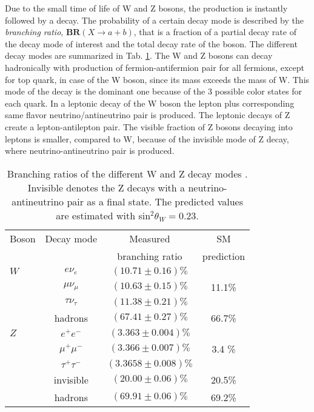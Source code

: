 Due to the small time of life of W and Z bosons, the production is instantly followed by a decay. 
The probability of a certain decay mode is described by the \textit{branching ratio}, $\textbf{BR}(X\to a+b)$, that is a fraction of a partial decay rate of the decay mode of interest and the total decay rate of the boson.  The different decay modes are summarized in Tab. \ref{tab:WZDecayModes}. The W and Z bosons can decay hadronically with production of fermion-antifermion pair for all fermions, except for top quark, in case of the W boson, since its mass exceeds the mass of W.  This mode of the decay is the dominant one because of the 3 possible color states for each quark. In a leptonic decay of the W boson the lepton plus corresponding same flavor neutrino/antineutrino  pair is produced. The leptonic decays of Z create a lepton-antilepton pair. The visible fraction of Z bosons decaying into leptons is smaller, compared to W, because of the invisible mode of Z decay, where neutrino-antineutrino pair is produced.

\begin{table}[!tbp]
\begin{center}
\caption{Branching ratios of the different W and Z decay modes \cite{Agashe:2014kda}. Invisible denotes the Z decays with a neutrino-antineutrino pair as a final state. The predicted values are estimated with sin$^2\theta_W = 0.23$.}
\label{tab:WZDecayModes}
\begin{tabular}{l | c | c | c }
\hline
Boson & Decay mode & Measured & SM \\
	& & branching ratio & prediction \\
\hline
$W$ & $e\nu_e$ & $(10.71\pm0.16)\%$ & \\
    & $\mu\nu_{\mu}$ & $(10.63\pm0.15)\%$ & 11.1\% \\
    & $\tau \nu_{\tau}$ & $(11.38\pm0.21)\%$ & \\
    & hadrons & $(67.41\pm0.27)\%$& 66.7\% \\
 \hline
 $Z$ & $e^+e^-$ & $(3.363\pm0.004)\%$ & \\
 	& $\mu^+\mu^-$ & $(3.366\pm0.007)\%$ & 3.4 \% \\
 	& $\tau^+ \tau^-$ & $(3.3658\pm0.008)\%$ & \\
 	& invisible & $(20.00\pm0.06)\%$ & 20.5\% \\
 	& hadrons & $(69.91\pm0.06)\%$ & 69.2\% \\
 \hline 
\end{tabular}
\end{center}
\end{table}

